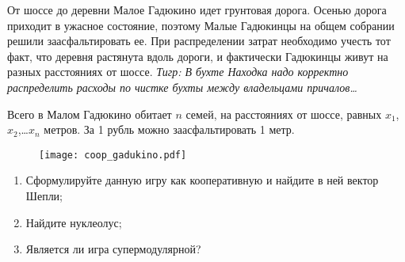 \begin{problem}
От шоссе до деревни Малое Гадюкино идет грунтовая дорога. Осенью дорога приходит в ужасное состояние, поэтому Малые Гадюкинцы на общем собрании решили заасфальтировать ее. При распределении затрат необходимо учесть тот факт, что деревня растянута вдоль дороги, и фактически Гадюкинцы живут на разных расстояниях от шоссе. 
{\it Тигр:  В бухте Находка надо корректно распределить расходы по чистке бухты между владельцами причалов\ldots }

Всего в Малом Гадюкино обитает  $n$  семей, на расстояниях от шоссе, равных  $x_{1}$,  $x_{2}$,\ldots  $x_{n}$ метров. За 1 рубль можно заасфальтировать 1 метр.


\begin{figure}[htbp]
	\texttt{[image: coop\_gadukino.pdf]}
\end{figure}





\begin{enumerate}
\item Сформулируйте данную игру как кооперативную и найдите в ней вектор Шепли;
\item Найдите нуклеолус;
\item Является ли игра супермодулярной?
\end{enumerate}



\begin{sol}

\end{sol}
\end{problem}



